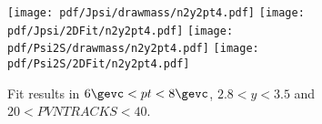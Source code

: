 \begin{figure}[H]
\begin{center}
\texttt{[image: pdf/Jpsi/drawmass/n2y2pt4.pdf]}
\texttt{[image: pdf/Jpsi/2DFit/n2y2pt4.pdf]}
\vspace*{-0.5cm}
\texttt{[image: pdf/Psi2S/drawmass/n2y2pt4.pdf]}
\texttt{[image: pdf/Psi2S/2DFit/n2y2pt4.pdf]}
\vspace*{-0.5cm}
\end{center}
\caption{Fit results in $6\gevc<pt<8\gevc$, $2.8<y<3.5$ and $20<PVNTRACKS<40$.}
\label{Fitn2y2pt4}
\end{figure}
